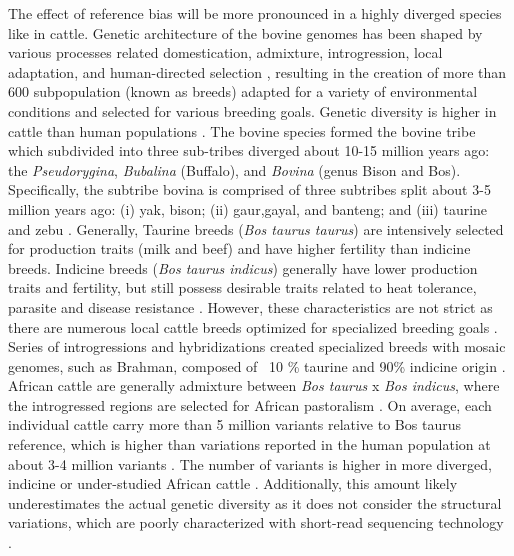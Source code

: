 \documentclass[../main.tex]{subfiles}
\begin{document}
The effect of reference bias will be more pronounced in a highly diverged species like in cattle. Genetic architecture of the bovine genomes has been shaped by various processes related domestication, admixture, introgression, local adaptation, and human-directed selection \citep{zhang2020evolution}, resulting in the creation of more than 600 subpopulation (known as breeds) adapted for a variety of environmental conditions and selected for various breeding goals. Genetic diversity is higher in cattle than human populations \citep{charlier2016ngs}. The bovine species formed the bovine tribe which subdivided into three sub-tribes diverged about 10-15 million years ago: the \emph{Pseudorygina},\emph{ Bubalina} (Buffalo), and \emph{Bovina} (genus Bison and Bos). Specifically, the subtribe bovina is comprised of three subtribes split about 3-5 million years ago: (i) yak, bison; (ii) gaur,gayal, and banteng; and (iii) taurine and zebu \citep{pitt2019domestication}. Generally, Taurine breeds (\emph{Bos taurus taurus}) are intensively selected for production traits (milk and beef) and have higher fertility than indicine breeds. Indicine breeds (\emph{Bos taurus indicus})  generally have lower production traits and fertility, but still possess desirable traits related to heat tolerance, parasite and disease resistance \citep{low2019haplotype}. However, these characteristics are not strict as there are numerous local cattle breeds optimized for specialized breeding goals \citep{signer2017population,upadhyay2019genomic}. Series of introgressions and hybridizations created specialized breeds with mosaic genomes, such as Brahman, composed of ~10 \% taurine and 90\% indicine origin \citep{koufariotis2018sequencing}. African cattle are generally admixture between \emph{Bos taurus} x \emph{Bos indicus}, where the introgressed regions are selected for African pastoralism \citep{kim2020mosaic}. On average, each individual cattle carry more than 5 million variants relative to Bos taurus reference, which is higher than variations reported in the human population at about 3-4 million variants \citep{daetwyler2014whole,sudmant2015integrated}. The number of variants is higher in more diverged, indicine \citep{koufariotis2018sequencing} or under-studied African cattle \citep{kim2020mosaic,kim2017genome}. Additionally, this amount likely underestimates the actual genetic diversity as it does not consider the structural variations, which are poorly characterized with short-read sequencing technology \citep{mahmoud2019structural,chaisson2019multi}. 
\end{document}
